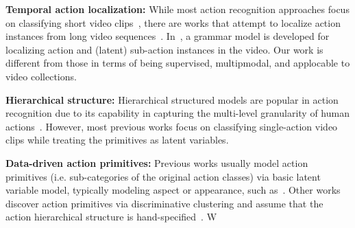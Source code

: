 {\bf Temporal action localization:} While most action recognition approaches focus on classifying short video clips~\cite{laptev08_cvpr, efros03_iccv, ryoo09_iccv}, there are works that attempt to localize action instances from long video sequences~\cite{duchenne09_iccv, hoai11_cvpr, laptev07_iccv, bojanowski14_eccv, pirsiavash14_cvpr}. In~\cite{pirsiavash14_cvpr}, a grammar model is developed for localizing action and (latent) sub-action instances in the video. Our work is different from those in terms of being supervised, multipmodal, and applocable to video collections.


{\bf Hierarchical structure:} Hierarchical structured models are popular in action recognition due to its capability in capturing the multi-level granularity of human actions~\cite{tang12_cvpr, lan14_eccv, lan14_vs, raptis13_cvpr}. However, most previous works focus on classifying single-action video clips while treating the primitives as latent variables. 

{\bf Data-driven action primitives:} Previous works usually model action primitives (i.e. sub-categories of the original action classes) via basic latent variable model, typically modeling aspect or appearance, such as~\cite{niebles10_eccv, yao10b_cvpr, jain13_cvpr}. Other works discover action primitives via discriminative clustering and assume that the action hierarchical structure is hand-specified~\cite{lan14_eccv, lan14_vs}. W


